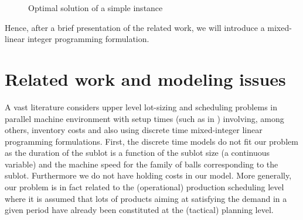 \begin{figure}[htbp]
\centering 
{}  
\caption{Optimal solution of a simple instance}
\label{fig_smallex}
\end{figure}


Hence, after a brief presentation of the related work, we will
introduce a mixed-linear integer programming formulation.


\section{Related work and modeling issues}
\label{sec:review}

A vast literature considers upper level lot-sizing and scheduling
problems in parallel machine environment with setup times (such as in
\cite{james2011single,xiao2013mip}) involving, among others, inventory
costs and also using discrete time mixed-integer linear programming
formulations. First, the discrete time models do not fit our problem
as the duration of the sublot is a function of the sublot size (a
continuous variable) and the machine speed for the family of balls
corresponding to the sublot. Furthermore we do not have holding costs
in our model. More generally, our problem is in fact related to the
(operational) production scheduling level where it is assumed that
lots of products aiming at satisfying the demand in a given period
have already been constituted at the (tactical) planning level.

